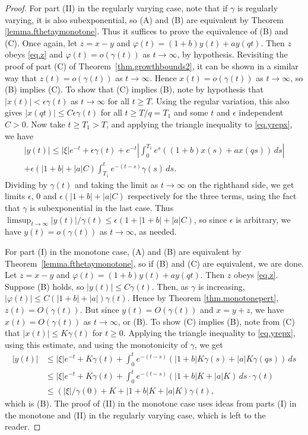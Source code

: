 \documentclass[a4paper,10pt,reqno]{amsart}
\numberwithin{equation}{section}
\theoremstyle{definition}
\theoremstyle{remark}
\DeclareMathOperator{\1}{\mathbbm 1}
\begin{document}
\begin{proof}
For part (II) in the regularly varying case, note that if $\gamma$ is regularly varying, it is also subexponential, so (A) and (B) are equivalent by Theorem \ref{lemma.fthetaymonotone}. Thus it suffices to prove the equivalence of (B) and (C). Once again, let $z=x-y$ and $\varphi(t)=(1+b)y(t)+ay(qt)$. Then $z$ obeys \eqref{eq.z} and $\varphi(t)=o(\gamma(t))$ as $t\to\infty$, by hypothesis. Revisiting the proof of part (C) of Theorem~\ref{thm.growthbounds2}, it can be shown in a similar way that  $z(t)=o(\gamma(t))$ as $t\to\infty$. Hence $x(t)=o(\gamma(t))$ as $t\to\infty$, so (B) implies (C). To show that (C) implies (B), note by hypothesis that $|x(t)| <\epsilon \gamma(t)$ as $t\to\infty$ for all $t\geq T$. Using the regular variation, this also gives $|x(qt)|\leq C\epsilon \gamma(t)$ for all $t\geq T/q=T_1$ and some $t$ and $\epsilon$ independent $C>0$. Now take $t\geq T_1>T$, and applying the triangle inequality to \eqref{eq.yrepx}, we have 
\begin{multline*}
	|y(t)|\leq |\xi|e^{-t}+\epsilon \gamma(t)+e^{-t}\left|\int_{0}^{T_1} e^s((1+b)x(s)+ax(qs))\,ds\right| \\
	+ \epsilon \left(|1+b| + |a|C\right) \int_{T_1}^t e^{-(t-s)} \gamma(s)\,ds.
\end{multline*}
Dividing by $\gamma(t)$ and taking the limit as $t\to\infty$ on the righthand side, we get limits $\epsilon$, $0$ and $\epsilon \left(|1+b| + |a|C\right)$ respectively for the three terms, using the fact that $\gamma$ is subexponential in the last case. Thus $\limsup_{t\to\infty} |y(t)|/\gamma(t)\leq \epsilon(1+|1+b| + |a|C)$,
so since $\epsilon$ is arbitrary, we have $y(t)=o(\gamma(t))$ as $t\to\infty$, as needed. 

For part (I) in the monotone case, (A) and (B) are equivalent by Theorem~\ref{lemma.fthetaymonotone}, so if (B) and (C) are equivalent, we are done. Let $z=x-y$ and $\varphi(t)=(1+b)y(t)+ay(qt)$. Then $z$ obeys \eqref{eq.z}. Suppose (B) holds, so $|y(t)|\leq C\gamma(t)$. Then, as $\gamma$ is increasing, $|\varphi(t)|\leq C(|1+b|+|a|)\gamma(t)$. Hence by Theorem \ref{thm.monotonepert}, $z(t)=O(\gamma(t))$. But since $y(t)=O(\gamma(t))$ and $x=y+z$, we have $x(t)=O(\gamma(t))$ as $t\to\infty$, or (B).  
To show (C) implies (B), note from (C) that $|x(t)|\leq K\gamma(t)$ for $t\geq 0$. Applying the triangle inequality to \eqref{eq.yrepx}, using this estimate, and using the monotonicity of $\gamma$, we get 
\begin{align*}
	|y(t)|&\leq |\xi|e^{-t}+K\gamma(t)+\int_0^t e^{-(t-s)}\left(|1+b|K\gamma(s)+|a|K\gamma(qs)\right)\,ds\\
	&\leq |\xi|e^{-t}+K\gamma(t)+\int_0^t e^{-(t-s)}\left(|1+b|K+|a|K\right)\,ds \cdot \gamma(t)\\
	&\leq (|\xi|/\gamma(0)+K+ |1+b|K+|a|K)\gamma(t),
\end{align*}
which is (B). The proof of (II) in the monotone case uses  ideas from parts (I) in the monotone and (II) in the regularly varying case, %
which is left to the reader.
\end{proof}
\end{document}

